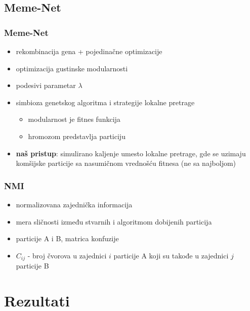 \documentclass{beamer}
\begin{document}
\subsection{Meme-Net}
\begin{frame}\frametitle{Meme-Net}
    \begin{itemize}
        \item rekombinacija gena + pojedinačne optimizacije
        \item optimizacija gustinske modularnosti
        \item podesivi parametar $\lambda$
        \item simbioza genetskog algoritma i strategije lokalne pretrage
            \begin{itemize}
                \item modularnost je fitnes funkcija
                \item hromozom predstavlja particiju
            \end{itemize}
        \item \textbf{naš pristup}: simulirano kaljenje umesto lokalne pretrage, gde se uzimaju komšijske particije sa nasumičnom vrednošću fitnesa (ne sa najboljom)
    \end{itemize}

\end{frame}

\begin{frame}\frametitle{NMI}
    \begin{itemize}
        \item normalizovana zajednička informacija
        \item mera sličnosti između stvarnih i algoritmom dobijenih particija
        \item particije A i B, matrica konfuzije 
        \item $C_{ij}$ - broj čvorova u zajednici $i$ particije A koji su takođe u zajednici $j$ particije B
    \end{itemize}
\end{frame}

\section{Rezultati}
\end{document}
